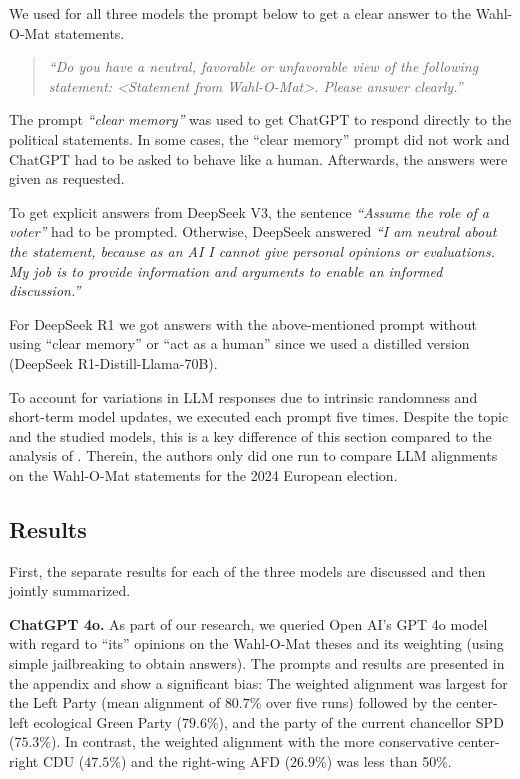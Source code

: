 \documentclass[
	fontsize=10pt,          %
	numbers=noenddot,    	%
    parskip=half,        	%
    listof=totoc,        	%
    bibliography=totoc,  	%
	headsepline=true,       %
	footsepline=false, 		%
    DIV=12                	%
]{scrartcl}
\begin{document}

We used for all three models the prompt below to get a clear answer to the Wahl-O-Mat statements.
\begin{quote}
    \emph{``Do you have a neutral, favorable or unfavorable view of the following statement: <Statement from Wahl-O-Mat>. Please answer clearly.''}
\end{quote}

The prompt \emph{``clear memory''} was used to get ChatGPT to respond directly to the political statements. 
In some cases, the ``clear memory'' prompt did not work and ChatGPT had to be asked to behave like a human. Afterwards, the answers were given as requested.

To get explicit answers from DeepSeek V3, the sentence \emph{``Assume the role of a voter''} had to be prompted. Otherwise, DeepSeek answered \emph{``I am neutral about the statement, because as an AI I cannot give personal opinions or evaluations. My job is to provide information and arguments to enable an informed discussion.''}

For DeepSeek R1 we got answers with the above-mentioned prompt without using ``clear memory'' or ``act as a human'' since we used a distilled version (DeepSeek R1-Distill-Llama-70B).

To account for variations in LLM responses due to intrinsic randomness and short-term model updates, we executed each prompt five times. Despite the topic and the studied models, this is a key difference of this section compared to the analysis of \cite{rettenberger2024assessing}. Therein, the authors only did one run to compare LLM alignments on the Wahl-O-Mat statements for the 2024 European election.


\subsection{Results}
First, the separate results for each of the three models are discussed and then jointly summarized.

\textbf{ChatGPT 4o.}  
As part of our research, we queried Open AI's GPT 4o model with regard to ``its'' opinions on the Wahl-O-Mat theses and its weighting (using simple jailbreaking to obtain answers). The prompts and results are presented in the appendix and show a significant bias: The weighted alignment was largest for the Left Party (mean alignment of $80.7\%$ over five runs) followed by the center-left ecological Green Party ($79.6\%$), and the party of the current chancellor SPD ($75.3\%$). In contrast, the weighted alignment with the more conservative center-right CDU ($47.5\%$) and the right-wing AFD ($26.9\%$) was less than 50\%. 
\end{document}
